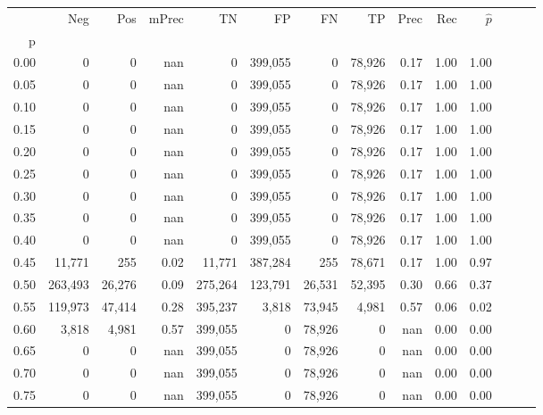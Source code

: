 \begin{tabular}{rrrrrrrrrrrrrr}
\toprule
{} &      Neg &     Pos & mPrec &       TN &       FP &      FN &      TP &  Prec &   Rec & $\hat{p}$ \\
p    &          &         &       &          &          &         &         &       &       &           \\
\midrule
0.00 &        0 &       0 &   nan &        0 &  399,055 &       0 &  78,926 &  0.17 &  1.00 &      1.00 \\
0.05 &        0 &       0 &   nan &        0 &  399,055 &       0 &  78,926 &  0.17 &  1.00 &      1.00 \\
0.10 &        0 &       0 &   nan &        0 &  399,055 &       0 &  78,926 &  0.17 &  1.00 &      1.00 \\
0.15 &        0 &       0 &   nan &        0 &  399,055 &       0 &  78,926 &  0.17 &  1.00 &      1.00 \\
0.20 &        0 &       0 &   nan &        0 &  399,055 &       0 &  78,926 &  0.17 &  1.00 &      1.00 \\
0.25 &        0 &       0 &   nan &        0 &  399,055 &       0 &  78,926 &  0.17 &  1.00 &      1.00 \\
0.30 &        0 &       0 &   nan &        0 &  399,055 &       0 &  78,926 &  0.17 &  1.00 &      1.00 \\
0.35 &        0 &       0 &   nan &        0 &  399,055 &       0 &  78,926 &  0.17 &  1.00 &      1.00 \\
0.40 &        0 &       0 &   nan &        0 &  399,055 &       0 &  78,926 &  0.17 &  1.00 &      1.00 \\
0.45 &   11,771 &     255 &  0.02 &   11,771 &  387,284 &     255 &  78,671 &  0.17 &  1.00 &      0.97 \\
0.50 &  263,493 &  26,276 &  0.09 &  275,264 &  123,791 &  26,531 &  52,395 &  0.30 &  0.66 &      0.37 \\
0.55 &  119,973 &  47,414 &  0.28 &  395,237 &    3,818 &  73,945 &   4,981 &  0.57 &  0.06 &      0.02 \\
0.60 &    3,818 &   4,981 &  0.57 &  399,055 &        0 &  78,926 &       0 &   nan &  0.00 &      0.00 \\
0.65 &        0 &       0 &   nan &  399,055 &        0 &  78,926 &       0 &   nan &  0.00 &      0.00 \\
0.70 &        0 &       0 &   nan &  399,055 &        0 &  78,926 &       0 &   nan &  0.00 &      0.00 \\
0.75 &        0 &       0 &   nan &  399,055 &        0 &  78,926 &       0 &   nan &  0.00 &      0.00 \\

\end{tabular}
